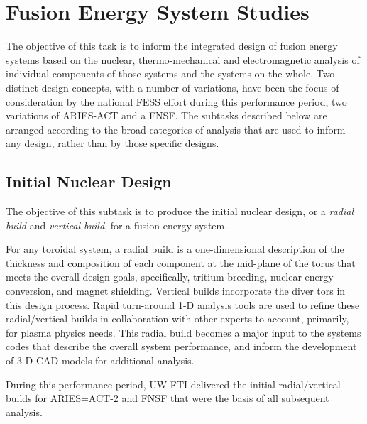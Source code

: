 \section{Fusion Energy System Studies}

The objective of this task is to inform the integrated design of fusion energy
systems based on the nuclear, thermo-mechanical and electromagnetic analysis
of individual components of those systems and the systems on the whole.  Two
distinct design concepts, with a number of variations, have been the focus of
consideration by the national \gls{FESS} effort during this performance
period, two variations of ARIES-ACT and a \gls{FNSF}.  The subtasks described
below are arranged according to the broad categories of analysis that are used
to inform any design, rather than by those specific designs.

\subsection{Initial Nuclear Design}

The objective of this subtask is to produce the initial nuclear design, or a
\emph{radial build} and \emph{vertical build}, for a fusion energy system.

For any toroidal system, a radial build is a one-dimensional description of
the thickness and composition of each component at the mid-plane of the torus
that meets the overall design goals, specifically, tritium breeding, nuclear
energy conversion, and magnet shielding.  Vertical builds incorporate the
diver tors in this design process.  Rapid turn-around 1-D analysis tools are
used to refine these radial/vertical builds in collaboration with other
experts to account, primarily, for plasma physics needs.  This radial build
becomes a major input to the systems codes that describe the overall system
performance, and inform the development of 3-D CAD models for additional
analysis.

During this performance period, \gls{UW-FTI} delivered the initial
radial/vertical builds for ARIES=ACT-2 and \gls{FNSF} that were the basis of
all subsequent analysis.

